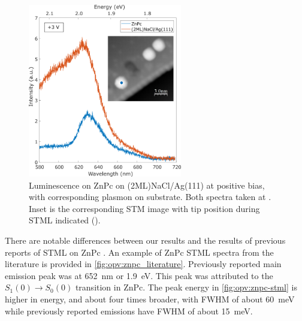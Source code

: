 


                    

\begin{figure} [H]
    \centering
    
        \includegraphics[width=0.6\textwidth]{pictures/znpc_+ve_emission_inset.png}
    
    \caption{Luminescence on ZnPc on (2ML)NaCl/Ag(111) at positive bias, with corresponding plasmon on substrate. Both spectra taken at . Inset is the corresponding STM image with tip position during STML indicated (). }
    \label{fig:opv:znpc-stml}
\end{figure}

There are notable differences between our results and the results of previous reports of \ac{STML} on ZnPc \citep{Zhang2016, Doppagne2017, Zhang2017, Doppagne2018}. An example of ZnPc \ac{STML} spectra from the literature is provided in \autoref{fig:opv:znpc_literature}. Previously reported main emission peak was at \SI{652}{nm} or \SI{1.9}{eV}. This peak was attributed to the $S_1(0) \rightarrow S_0(0)$ transition in ZnPc. The peak energy in \autoref{fig:opv:znpc-stml} is higher in energy, and about four times broader, with \ac{FWHM} of about \SI{60}{meV} while previously reported emissions have \ac{FWHM} of about \SI{15}{meV}.

